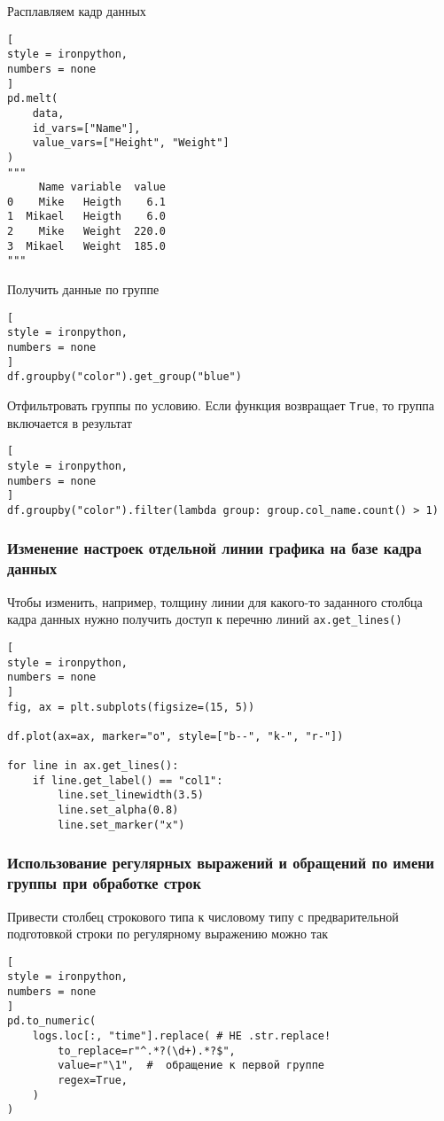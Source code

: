 \documentclass[%
	11pt,
	a4paper,
	utf8,
		]{article}
\begin{document}
Расплавляем кадр данных
\begin{lstlisting}[
style = ironpython,
numbers = none
]
pd.melt(
    data,
    id_vars=["Name"],
    value_vars=["Height", "Weight"]
)
"""
     Name variable  value
0    Mike   Heigth    6.1
1  Mikael   Heigth    6.0
2    Mike   Weight  220.0
3  Mikael   Weight  185.0
"""
\end{lstlisting}

Получить данные по группе
\begin{lstlisting}[
style = ironpython,
numbers = none
]
df.groupby("color").get_group("blue")
\end{lstlisting}

Отфильтровать группы по условию. Если функция возвращает \texttt{True}, то группа включается в результат
\begin{lstlisting}[
style = ironpython,
numbers = none
]
df.groupby("color").filter(lambda group: group.col_name.count() > 1)
\end{lstlisting}

\subsubsection{Изменение настроек отдельной линии графика на базе кадра данных}
Чтобы изменить, например, толщину линии для какого-то заданного столбца кадра данных нужно получить доступ к перечню линий \verb|ax.get_lines()|
\begin{lstlisting}[
style = ironpython,
numbers = none
]
fig, ax = plt.subplots(figsize=(15, 5))

df.plot(ax=ax, marker="o", style=["b--", "k-", "r-"])

for line in ax.get_lines():
    if line.get_label() == "col1":
        line.set_linewidth(3.5)
        line.set_alpha(0.8)
        line.set_marker("x")
\end{lstlisting}

\subsubsection{Использование регулярных выражений и обращений по имени группы при обработке строк}

Привести столбец строкового типа к числовому типу с предварительной подготовкой строки по регулярному выражению можно так
\begin{lstlisting}[
style = ironpython,
numbers = none	
]
pd.to_numeric(
    logs.loc[:, "time"].replace( # НЕ .str.replace!
        to_replace=r"^.*?(\d+).*?$",
        value=r"\1",  #  обращение к первой группе
        regex=True,
    )
)
\end{lstlisting}
\end{document}
